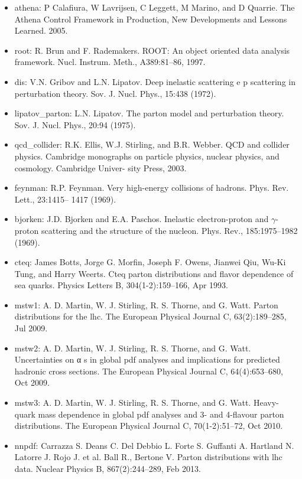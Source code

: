\begin{itemize}
	\item athena: P Calafiura, W Lavrijsen, C Leggett, M Marino, and D Quarrie. The Athena 	Control Framework in Production, New Developments and Lessons Learned. 	2005.
	\item root: R. Brun and F. Rademakers. ROOT: An object oriented data analysis framework. Nucl. Instrum. Meth., A389:81–86, 1997.
	\item dis: V.N. Gribov and L.N. Lipatov. Deep inelastic scattering e p scattering in perturbation theory. Sov. J. Nucl. Phys., 15:438 (1972).
	\item lipatov\_parton: L.N. Lipatov. The parton model and perturbation theory. Sov. J. Nucl. Phys., 20:94
	(1975).
	\item qcd\_collider: R.K. Ellis, W.J. Stirling, and B.R. Webber. QCD and collider physics. Cambridge
	monographs on particle physics, nuclear physics, and cosmology. Cambridge Univer-
	sity Press, 2003.
	\item feynman: R.P. Feynman. Very high-energy collisions of hadrons. Phys. Rev. Lett., 23:1415–
	1417 (1969).
	\item bjorken: J.D. Bjorken and E.A. Paschos. Inelastic electron-proton and $\gamma$-proton scattering
	and the structure of the nucleon. Phys. Rev., 185:1975–1982 (1969).
	\item cteq: James Botts, Jorge G. Morfin, Joseph F. Owens, Jianwei Qiu, Wu-Ki Tung,
	and Harry Weerts. Cteq parton distributions and flavor dependence of sea
	quarks. Physics Letters B, 304(1-2):159–166, Apr 1993.
	\item mstw1: A. D. Martin, W. J. Stirling, R. S. Thorne, and G. Watt. Parton distributions
	for the lhc. The European Physical Journal C, 63(2):189–285, Jul 2009.
	\item mstw2: A. D. Martin, W. J. Stirling, R. S. Thorne, and G. Watt. Uncertainties on α s
	in global pdf analyses and implications for predicted hadronic cross sections.
	The European Physical Journal C, 64(4):653–680, Oct 2009.
	\item mstw3: A. D. Martin, W. J. Stirling, R. S. Thorne, and G. Watt. Heavy-quark mass
	dependence in global pdf analyses and 3- and 4-flavour parton distributions.
	The European Physical Journal C, 70(1-2):51–72, Oct 2010.
	\item nnpdf:  Carrazza S. Deans C. Del Debbio L. Forte S. Guffanti A. Hartland N. Latorre
	J. Rojo J. et al. Ball R., Bertone V. Parton distributions with lhc data. Nuclear
	Physics B, 867(2):244–289, Feb 2013.

\end{itemize}


